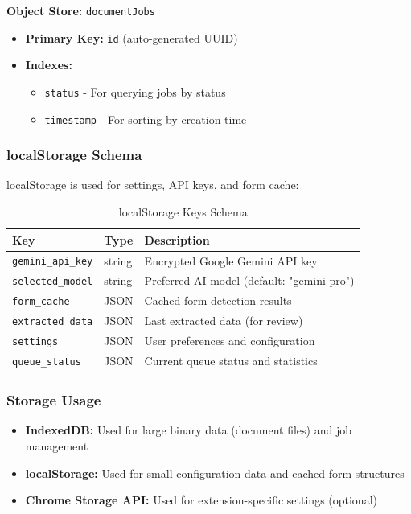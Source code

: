 \documentclass[11pt, a4paper]{article}
\theoremstyle{plain}
\theoremstyle{definition}
\begin{document}
\textbf{Object Store:} \texttt{documentJobs}
\begin{itemize}
    \item \textbf{Primary Key:} \texttt{id} (auto-generated UUID)
    \item \textbf{Indexes:}
    \begin{itemize}
        \item \texttt{status} - For querying jobs by status
        \item \texttt{timestamp} - For sorting by creation time
    \end{itemize}
\end{itemize}

\subsubsection{localStorage Schema}

localStorage is used for settings, API keys, and form cache:

\begin{table}[H]
\centering
\caption{localStorage Keys Schema}
\label{tab:localstorage-schema}
\begin{tabularx}{\textwidth}{lXl}
\toprule
\textbf{Key} & \textbf{Type} & \textbf{Description} \\
\midrule
\texttt{gemini\_api\_key} & string & Encrypted Google Gemini API key \\
\texttt{selected\_model} & string & Preferred AI model (default: "gemini-pro") \\
\texttt{form\_cache} & JSON & Cached form detection results \\
\texttt{extracted\_data} & JSON & Last extracted data (for review) \\
\texttt{settings} & JSON & User preferences and configuration \\
\texttt{queue\_status} & JSON & Current queue status and statistics \\
\bottomrule
\end{tabularx}
\end{table}

\subsubsection{Storage Usage}

\begin{itemize}
    \item \textbf{IndexedDB:} Used for large binary data (document files) and job management
    \item \textbf{localStorage:} Used for small configuration data and cached form structures
    \item \textbf{Chrome Storage API:} Used for extension-specific settings (optional)
\end{itemize}
\end{document}
